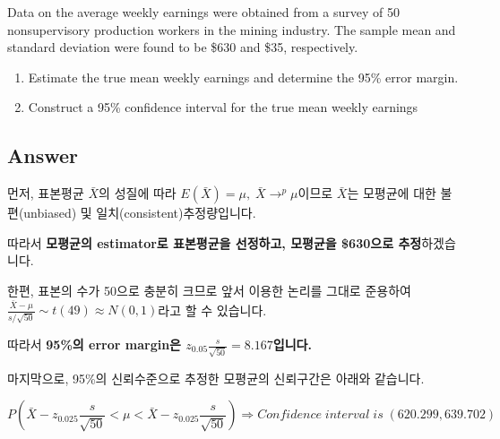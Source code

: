 \documentclass[
  letterpaper,
  DIV=11,
  numbers=noendperiod]{scrreprt}
\providecommand{\tightlist}{%
  \setlength{\itemsep}{0pt}\setlength{\parskip}{0pt}}\usepackage{longtable,booktabs,array}
\begin{document}

Data on the average weekly earnings were obtained from a survey of 50
nonsupervisory production workers in the mining industry. The sample
mean and standard deviation were found to be \$630 and \$35,
respectively.

\begin{enumerate}
\def\labelenumi{(\alph{enumi})}
\tightlist
\item
  Estimate the true mean weekly earnings and determine the 95\% error
  margin.
\item
  Construct a 95\% confidence interval for the true mean weekly earnings
\end{enumerate}

\subsection*{Answer}\label{answer-15}

먼저, 표본평균 \(\bar{X}\)의 성질에 따라
\(E(\bar{X})=\mu,\;\bar{X}\rightarrow^p \mu\)이므로 \(\bar{X}\)는
모평균에 대한 불편(unbiased) 및 일치(consistent)추정량입니다.

따라서 \textbf{모평균의 estimator로 표본평균을 선정하고, 모평균을
\$630으로 추정}하겠습니다.

한편, 표본의 수가 50으로 충분히 크므로 앞서 이용한 논리를 그대로
준용하여 \(\frac{\bar{X}-\mu}{s/\sqrt{50}}\sim t(49)\approx N(0,1)\)라고
할 수 있습니다.

따라서 \textbf{95\%의 error margin은
\(z_{0.05}\frac{s}{\sqrt{50}}=8.167\)입니다.}

마지막으로, 95\%의 신뢰수준으로 추정한 모평균의 신뢰구간은 아래와
같습니다.

\[P(\bar{X}-z_{0.025}\frac{s}{\sqrt{50}}<\mu<\bar{X}-z_{0.025}\frac{s}{\sqrt{50}})\Rightarrow Confidence\;interval\;is\;(620.299,639.702)\]
\end{document}
